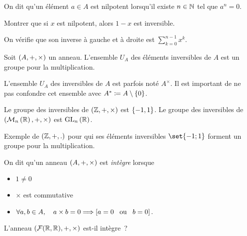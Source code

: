 \documentclass{magnolia}
\begin{document}
\begin{definition}
On dit qu'un élément $a\in A$ est nilpotent lorsqu'il existe $n\in\mathbb{N}$ tel que $a^n=0$.
\end{definition}

\begin{exoUnique}
\exo Montrer que si $x$ est nilpotent, alors $1-x$ est inversible.
\end{exoUnique}
\begin{sol}
On vérifie que son inverse à gauche et à droite est $\displaystyle\sum_{k=0}^{n-1}x^k$.
\end{sol}

\begin{definition}
Soit $\left(A,+,\times\right)$ un anneau. L'ensemble $U_A$ des éléments inversibles de $A$
est un groupe pour la multiplication.
\end{definition}

\begin{remarqueUnique}
\remarque L'ensemble $U_A$ des inversibles de $A$ est parfois noté $A^\times$. Il est important de ne pas
  confondre cet ensemble avec $A^*\coloneqq A\setminus\left\{0\right\}$.
\end{remarqueUnique}

\begin{exemples}
\exemple Le groupe des inversibles de $(\mathbb{Z},+,\times)$ est $\left\{-1,1\right\}$.
\exemple Le groupe des inversibles de $(\mathcal{M}_{n}\left(\mathbb{R}\right),+,\times)$ est ${\rm GL}_{n}\left(\mathbb{R}\right)$.
\end{exemples}

\begin{sol}
Exemple de $(\mathbb{Z},+,.)$ pour qui ses éléments inversibles $\set{-1;1}$ forment un groupe pour la multiplication.
\end{sol}


\begin{definition}
On dit qu'un anneau $\left(A,+,\times\right)$ est \emph{intègre} lorsque
\begin{itemize}
\item $1\neq 0$
\item $\times$ est commutative
\item $\forall a,b\in A ,\quad a\times b=0 \Longrightarrow \left[a=0 \quad\!\text{ou}\quad\! b=0\right].$
\end{itemize}
\end{definition}

\begin{exoUnique}
\exo L'anneau $(\mathcal{F}(\mathbb{R},\mathbb{R}),+,\times)$ est-il intègre~?
\end{exoUnique}
\end{document}
